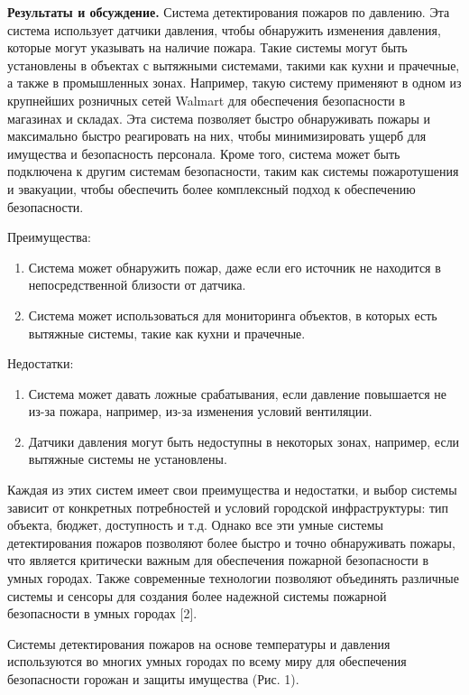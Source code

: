 \begin{multicols}{2}
{\bfseries Результаты и обсуждение.} Система детектирования пожаров по
давлению. Эта система использует датчики давления, чтобы обнаружить
изменения давления, которые могут указывать на наличие пожара. Такие
системы могут быть установлены в объектах с вытяжными системами, такими
как кухни и прачечные, а также в промышленных зонах. Например, такую
систему применяют в одном из крупнейших розничных сетей Walmart для
обеспечения безопасности в магазинах и складах. Эта система позволяет
быстро обнаруживать пожары и максимально быстро реагировать на них,
чтобы минимизировать ущерб для имущества и безопасность персонала. Кроме
того, система может быть подключена к другим системам безопасности,
таким как системы пожаротушения и эвакуации, чтобы обеспечить более
комплексный подход к обеспечению безопасности.

Преимущества:

\begin{enumerate}
\def\labelenumi{\arabic{enumi}.}
\item
  Система может обнаружить пожар, даже если его источник не находится в
  непосредственной близости от датчика.
\item
  Система может использоваться для мониторинга объектов, в которых есть
  вытяжные системы, такие как кухни и прачечные.
\end{enumerate}

Недостатки:

\begin{enumerate}
\def\labelenumi{\arabic{enumi}.}
\item
  Система может давать ложные срабатывания, если давление повышается не
  из-за пожара, например, из-за изменения условий вентиляции.
\item
  Датчики давления могут быть недоступны в некоторых зонах, например,
  если вытяжные системы не установлены.
\end{enumerate}

Каждая из этих систем имеет свои преимущества и недостатки, и выбор
системы зависит от конкретных потребностей и условий городской
инфраструктуры: тип объекта, бюджет, доступность и т.д. Однако все эти
умные системы детектирования пожаров позволяют более быстро и точно
обнаруживать пожары, что является критически важным для обеспечения
пожарной безопасности в умных городах. Также современные технологии
позволяют объединять различные системы и сенсоры для создания более
надежной системы пожарной безопасности в умных городах {[}2{]}.

Системы детектирования пожаров на основе температуры и давления
используются во многих умных городах по всему миру для обеспечения
безопасности горожан и защиты имущества (Рис. 1).


\end{multicols}
